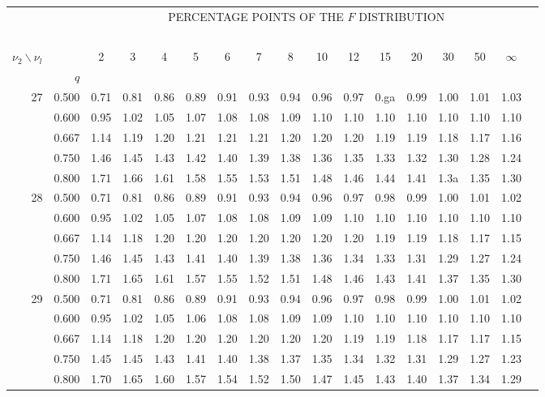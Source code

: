 {\begin{center}
\begin{tabular}{rrr@{\,}r@{\,}r@{\,}r@{\,}r@{\,}r@{\,}r@{\,}r
                   @{\,}r@{\,}r@{\,}r@{\,}r@{\,}r@{\,}r@{\,}r}
&&\multicolumn{14}{c}{PERCENTAGE POINTS OF THE $F$ DISTRIBUTION}\\
\ \\
$\nu_2\backslash\nu_l$ & & 
\multicolumn{1}{c}{2} &\multicolumn{1}{c}{3} &
\multicolumn{1}{c}{4} &\multicolumn{1}{c}{5} &
\multicolumn{1}{c}{6} &\multicolumn{1}{c}{7} &
\multicolumn{1}{c}{8} &\multicolumn{1}{c}{10}&
\multicolumn{1}{c}{12}&\multicolumn{1}{c}{15}&
\multicolumn{1}{c}{20}&\multicolumn{1}{c}{30}&
\multicolumn{1}{c}{50}&\multicolumn{1}{c}{$\infty$}\\
& $q$ \\
27&0.500&0.71&0.81&0.86&0.89&0.91&0.93&0.94&0.96&0.97&0.ga&0.99&1.00&1.01&1.03\\
  &0.600&0.95&1.02&1.05&1.07&1.08&1.08&1.09&1.10&1.10&1.10&1.10&1.10&1.10&1.10\\
  &0.667&1.14&1.19&1.20&1.21&1.21&1.21&1.20&1.20&1.20&1.19&1.19&1.18&1.17&1.16\\
  &0.750&1.46&1.45&1.43&1.42&1.40&1.39&1.38&1.36&1.35&1.33&1.32&1.30&1.28&1.24\\
  &0.800&1.71&1.66&1.61&1.58&1.55&1.53&1.51&1.48&1.46&1.44&1.41&1.3a&1.35&1.30\\
28&0.500&0.71&0.81&0.86&0.89&0.91&0.93&0.94&0.96&0.97&0.98&0.99&1.00&1.01&1.02\\
  &0.600&0.95&1.02&1.05&1.07&1.08&1.08&1.09&1.09&1.10&1.10&1.10&1.10&1.10&1.10\\
  &0.667&1.14&1.18&1.20&1.20&1.20&1.20&1.20&1.20&1.20&1.19&1.19&1.18&1.17&1.15\\
  &0.750&1.46&1.45&1.43&1.41&1.40&1.39&1.38&1.36&1.34&1.33&1.31&1.29&1.27&1.24\\
  &0.800&1.71&1.65&1.61&1.57&1.55&1.52&1.51&1.48&1.46&1.43&1.41&1.37&1.35&1.30\\
29&0.500&0.71&0.81&0.86&0.89&0.91&0.93&0.94&0.96&0.97&0.98&0.99&1.00&1.01&1.02\\
  &0.600&0.95&1.02&1.05&1.06&1.08&1.08&1.09&1.09&1.10&1.10&1.10&1.10&1.10&1.10\\
  &0.667&1.14&1.18&1.20&1.20&1.20&1.20&1.20&1.20&1.19&1.19&1.18&1.17&1.17&1.15\\
  &0.750&1.45&1.45&1.43&1.41&1.40&1.38&1.37&1.35&1.34&1.32&1.31&1.29&1.27&1.23\\
  &0.800&1.70&1.65&1.60&1.57&1.54&1.52&1.50&1.47&1.45&1.43&1.40&1.37&1.34&1.29\\

\end{tabular}
\end{center}}
